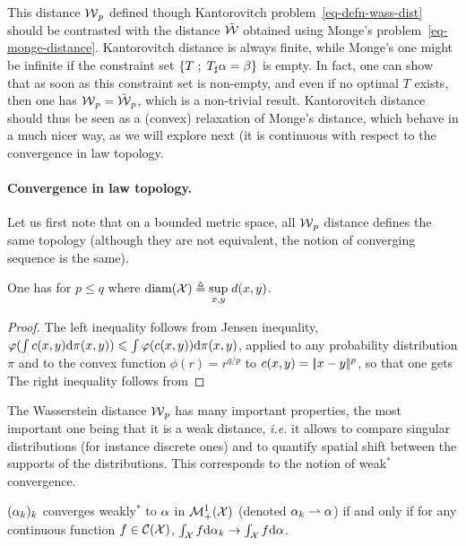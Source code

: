 This distance $\operatorname{\mathcal{W}}_p$ defined though Kantorovitch problem~\eqref{eq-defn-wass-dist} should be contrasted with the distance $\tilde{\operatorname{\mathcal{W}}}$ obtained using Monge's problem~\eqref{eq-monge-distance}. Kantorovitch distance is always finite, while Monge's one might be infinite if the constraint set $\left\{ T \;;\; T_\sharp \alpha=\beta \right\}$ is empty. In fact, one can show that as soon as this constraint set is non-empty, and even if no optimal $T$ exists, then one has $\operatorname{\mathcal{W}}_p = \tilde{\operatorname{\mathcal{W}}}_p$, which is a non-trivial result. Kantorovitch distance should thus be seen as a (convex) relaxation of Monge's distance, which behave in a much nicer way, as we will explore next (it is continuous with respect to the convergence in law topology.


\paragraph{Convergence in law topology.}

Let us first note that on a bounded metric space, all $\operatorname{\mathcal{W}}_p$ distance defines the same topology (although they are not equivalent, the notion of converging sequence is the same).

\begin{prop}\label{prop-comp-wass-p}
	One has for $p \leq q$
	where $\text{\upshape diam}(\mathcal{X}) \triangleq \underset{x,y}{\sup}\; d(x,y)$.
\end{prop}
\begin{proof}
	The left inequality follows from Jensen inequality, $\varphi(\int c(x,y) \mathrm{d}\pi(x,y)) \leqslant \int \varphi(c(x,y)) \mathrm{d}\pi(x,y)$, applied to any probability distribution $\pi$ and to the convex function $\phi(r)=r^{q/p}$ to $c(x,y)=|\!| x-y |\!|^p$, so that one gets
	The right inequality follows from
\end{proof}

The Wasserstein distance $\operatorname{\mathcal{W}}_p$ has many important properties, the most important one being that it is a weak distance, \emph{i.e.} it allows to compare singular distributions (for instance discrete ones) and to quantify spatial shift between the supports of the distributions. This corresponds to the notion of weak$^*$ convergence.

\begin{defn}\label{dfn-weak-conv}
	$(\alpha_k)_k$ converges weakly$^*$ to $\alpha$ in $\mathcal{M}_+^1(\mathcal{X})$ (denoted $\alpha_k \rightharpoonup \alpha$) if and only if for any continuous function $f \in \mathcal{C}(\mathcal{X})$, $\int_{\mathcal{X}} f \mathrm{d}\alpha_k \rightarrow \int_{\mathcal{X}} f \mathrm{d}\alpha$.
\end{defn}

